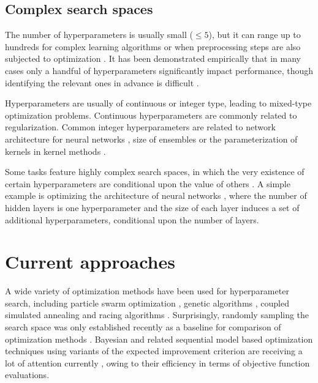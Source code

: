 \documentclass{mic2015}
\begin{document}
\subsection{Complex search spaces}
The number of hyperparameters is usually small ($\leq5$), but it can range up to hundreds for complex learning algorithms \citep{bergstra2013making} or when preprocessing steps are also subjected to optimization \citep{hutter2009paramils}. It has been demonstrated empirically that in many cases only a handful of hyperparameters significantly impact performance, though identifying the relevant ones in advance is difficult \citep{bergstra2012random}.

Hyperparameters are usually of continuous or integer type, leading to mixed-type optimization problems. Continuous hyperparameters are commonly related to regularization.  Common integer hyperparameters are related to network architecture for neural networks \citep{bishop1995neural}, size of ensembles \citep{breiman2001random, ensemblesvm-jmlr} or the parameterization of kernels in kernel methods \citep{scholkopf2002learning}.

Some tasks feature highly complex search spaces, in which the very existence of certain hyperparameters are conditional upon the value of others \citep{hutter2009paramils,bergstra2011algorithms,bergstra2013hyperopt}. A simple example is optimizing the architecture of neural networks \citep{bishop1995neural}, where the number of hidden layers is one hyperparameter and the size of each layer induces a set of additional hyperparameters, conditional upon the number of layers. 

\section{Current approaches} \label{state-of-the-art}
A wide variety of optimization methods have been used for hyperparameter search, including particle swarm optimization \citep{meissner2006optimized, lin2008particle}, genetic algorithms \citep{tsai2006tuning}, coupled simulated annealing \citep{xavier2010coupled} and racing algorithms \citep{birattari2010f}. Surprisingly, randomly sampling the search space was only established recently as a baseline for comparison of optimization methods \citep{bergstra2012random}. Bayesian and related sequential model based optimization techniques using variants of the expected improvement criterion \citep{jones1998efficient} are receiving a lot of attention currently \citep{bergstra2011algorithms, hutter2011sequential, snoek2012practical, bachoc2013cross, eggensperger2013towards}, owing to their efficiency in terms of objective function evaluations.
\end{document}
